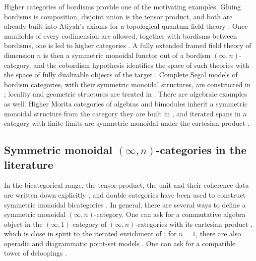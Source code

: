 \documentclass[10pt,reqno]{amsart}
\begin{document}
Higher categories of bordisms provide one of the motivating examples.
Gluing bordisms is composition, disjoint union is the tensor product,
and both are already built into Atiyah's axioms for a topological
quantum field theory \cite{Atiyah1988}. Once manifolds of every
codimension are allowed, together with bordisms between bordisms, one
is led to higher categories \cite{BaezDolan1995}. A fully extended
framed field theory of dimension $n$ is then a symmetric monoidal
functor out of a bordism $(\infty,n)$-category, and the cobordism
hypothesis identifies the space of such theories with the space of
fully dualizable objects of the target \cite[\S2.4]{lurie2009tft}.
Complete Segal models of bordism categories, with their symmetric
monoidal structures, are constructed in \cite{calaque2019cobordisms};
locality and geometric structures are treated in
\cite{gradypavlov2020locality,GradyPavlov2026Bordisms}. There are
algebraic examples as well. Higher Morita categories of algebras and
bimodules \cite{Vitale1992,dutta2025morita} inherit a symmetric
monoidal structure from the category they are built in
\cite{HaugsengMorita,johnsonfreyd2017oplax}, and iterated spans in a
category with finite limits are symmetric monoidal under the cartesian
product \cite{Haugseng2018Spans}.

\subsection*{Symmetric monoidal $(\infty,n)$-categories in the literature}
In the bicategorical range, the tensor product, the unit and their
coherence data are written down explicitly
\cite{SchommerPries2011,GurskiOsorno2013}, and double categories have
been used to construct symmetric monoidal bicategories
\cite{Shulman2010}. In general, there are several ways to define a
symmetric monoidal $(\infty,n)$-category. One can ask for a
commutative algebra object in the $(\infty,1)$-category of
$(\infty,n)$-categories with its cartesian product
\cite[\S4.1]{lurie2009tft}, which is close in spirit to the iterated
enrichment of \cite{GepnerHaugseng2015}; for $n=1$, there are also
operadic and diagrammatic point-set models
\cite{KodjabachevSagave2015,NikolausSagave2017}. One can ask for a
compatible tower of deloopings
\cite{schommerpries2014dualizability,calaque2019cobordisms,Haugseng2018Spans}.
\end{document}

